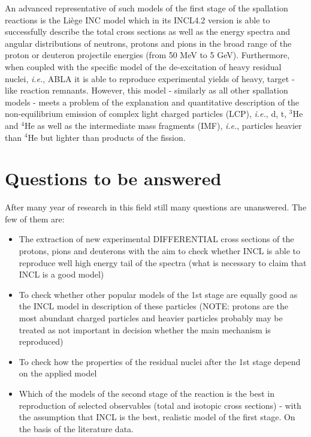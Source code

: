 	
	 An advanced representative of such models of the first stage of the spallation reactions is the Li\`ege INC model which in its INCL4.2 version \cite{boudard2002intranuclear} is able to successfully describe the total cross sections as well as the energy spectra and angular distributions of neutrons, protons and pions in the broad range of the proton or deuteron projectile energies (from 50 MeV to 5 GeV). Furthermore, when coupled with the specific model of the de-excitation of heavy residual nuclei, \emph{i.e.}, ABLA \cite{kelic2009abla07} it is able to reproduce experimental yields of heavy, target - like reaction remnants. However, this model - similarly as all other spallation models - meets a problem of the explanation and quantitative description of the non-equilibrium emission of complex light charged particles (LCP), \emph{i.e.},  d, t, $^3$He and $^4$He as well as the intermediate mass fragments (IMF), \emph{i.e.}, particles heavier than $^{4}$He but lighter than products of the fission.
\section{Questions to be answered}
After many year of research in this field still many questions are unanswered. 
The few of them are:
\begin{itemize}
	
	\item The extraction of new experimental DIFFERENTIAL cross sections of the 
	protons, pions and deuterons with the aim to check whether INCL is able to reproduce well high energy tail of the spectra (what is necessary to claim that INCL is a good model)
	\item  To check whether other popular models of the 1st stage are equally good as the INCL model in description of these particles (NOTE: protons are the most abundant charged particles and heavier particles probably may be treated as not important in decision whether the main mechanism is reproduced)
	\item To check how the properties of the residual nuclei after the 1st stage depend on the applied model 
	\item Which of the models of the second stage of the reaction is the best in reproduction of selected observables (total and isotopic cross sections) -
	with the assumption that INCL is the best, realistic model of the first stage. On the basis of the literature data.
\end{itemize}

